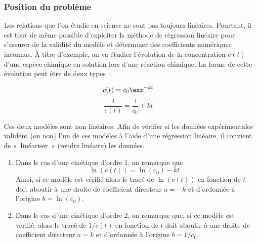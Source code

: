 \documentclass[../main/main.tex]{subfiles}
\begin{document}
\subsubsection{Position du problème}

Les relations que l'on étudie en science ne sont pas toujours linéaires.
Pourtant, il est tout de même possible d'exploiter la méthode de
régression linéaire pour s'assurer de la validité du modèle et
déterminer des coefficients numériques inconnus. À titre d'exemple, on va
étudier l'évolution de la concentration $c(t)$ d'une espèce chimique en
solution lors d'une réaction chimique. La forme de cette évolution peut
être de deux types~:

\begin{tcolorbox}[blankest]
	\begin{isd}
		\[
			c(t) = c_0 \exr^{-kt}
		\]
		\tcblower
		\[
			\frac{1}{c(t)} = \frac{1}{c_0} + kt
		\]
	\end{isd}
\end{tcolorbox}

%
%
%

Ces deux modèles sont non linéaires. Afin de vérifier si les données
expérimentales valident (ou non) l'un de ces modèles à l'aide d'une régression
linéaire, il convient de «~linéariser~» (rendre linéaire) les données.

\begin{enumerate}
	\item Dans le cas d'une cinétique d'ordre 1, on remarque que
	      \[
		      \ln(c(t)) = \ln(c_0)-kt
	      \]
	      Ainsi, si ce modèle est vérifié alors le tracé de $\ln(c(t))$ en
	      fonction de $t$ doit aboutir à une droite de coefficient directeur
	      $a=-k$ et d'ordonnée à l'origine $b = \ln(c_0)$.
	\item Dans le cas d'une cinétique d'ordre 2, on remarque que, si ce modèle
	      est vérifié, alors le tracé de $1/c(t)$ en fonction de $t$ doit aboutir
	      à une droite de coefficient directeur $a=k$ et d'ordonnée à l'origine $b
		      = 1/c_0$.
\end{enumerate}
\end{document}
